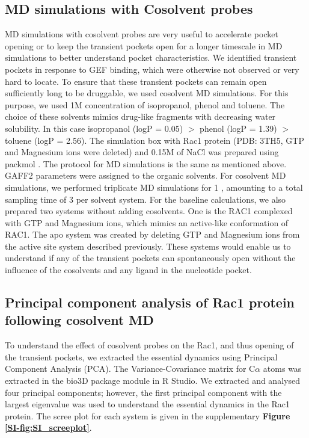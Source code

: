 \documentclass[12pt, a4paper]{achemso}
\begin{document}
\subsection{MD simulations with Cosolvent probes} 
MD simulations with cosolvent probes are very useful to accelerate pocket opening or to keep the transient pockets open for a longer timescale in MD simulations to better understand pocket characteristics. We identified transient pockets in response to GEF binding, which were otherwise not observed or very hard to locate. To ensure that these transient pockets can remain open sufficiently long to be druggable, we used cosolvent MD simulations. For this purpose, we used 1M concentration of isopropanol, phenol and toluene. The choice of these solvents mimics drug-like fragments with decreasing water solubility. In this case isopropanol (logP = 0.05) $>$ phenol (logP = 1.39)  $>$ toluene (logP = 2.56). The simulation box with Rac1 protein (PDB: 3TH5, GTP and Magnesium ions were deleted) and 0.15M of NaCl was prepared using packmol \cite{martinez2009packmol}. The protocol for MD simulations is the same as mentioned above. GAFF2 parameters were assigned to the organic solvents. For cosolvent MD simulations, we performed triplicate MD simulations for 1 ,  amounting to a total sampling time of 3  per solvent system. For the baseline calculations, we also prepared two systems without adding cosolvents.  One is the RAC1 complexed with GTP and Magnesium ions, which mimics an active-like conformation of RAC1. The apo system was created by deleting GTP and Magnesium ions from the active site system described previously. These systems would enable us to understand if any of the transient pockets can spontaneously open without the influence of the cosolvents and any ligand in the nucleotide pocket.

\subsection{Principal component analysis of Rac1 protein following cosolvent MD}
To understand the effect of cosolvent probes on the Rac1, and thus opening of the transient pockets, we extracted the essential dynamics using Principal Component Analysis (PCA). The Variance-Covariance matrix for C$\alpha$ atoms was extracted in the bio3D package\cite{bio3d} module in R Studio. We extracted and analysed four principal components; however, the first principal component with the largest eigenvalue was used to understand the essential dynamics in the Rac1 protein. The scree plot for each system is given in the supplementary \textbf{Figure \ref{SI-fig:SI_screeplot}}.
\end{document}
